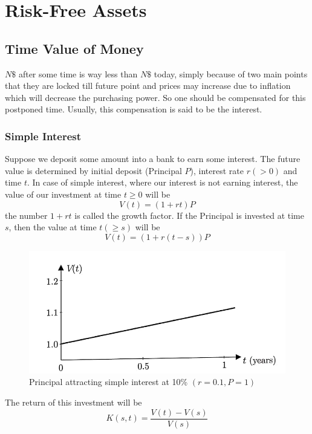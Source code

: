 \chapter{Risk-Free Assets}

\section{Time Value of Money}
$N\$$ after some time is way less than $N\$$ today, simply because of two main points that they are locked till future point and prices may increase due to inflation which will decrease the purchasing power. So one should be compensated for this postponed time. Usually, this compensation is said to be the interest.
\subsection{Simple Interest}
Suppose we deposit some amount into a bank to earn some interest. The future value is determined by initial deposit (Principal $P$), interest rate $r(>0)$ and time $t$. In case of simple interest, where our interest is not earning interest, the value of our investment at time $t \geq 0$ will be \begin{equation} V(t)=(1+rt)P \end{equation}
the number $1+rt$ is called the growth factor.
If the Principal is invested at time $s$, then the value at time $t(\geq s)$ will be \begin{equation} V(t)=(1+r(t-s))P \end{equation}

\begin{figure}[htp]
    \centering
    \includegraphics[width=15cm]{1.jpg}
    \caption{Principal attracting simple interest at 10\% $(r=0.1,P=1)$}
    \label{fig:SI}
\end{figure}

The return of this investment will be \begin{equation} K(s,t)=\frac{V(t)-V(s)}{V(s)} \end{equation}

